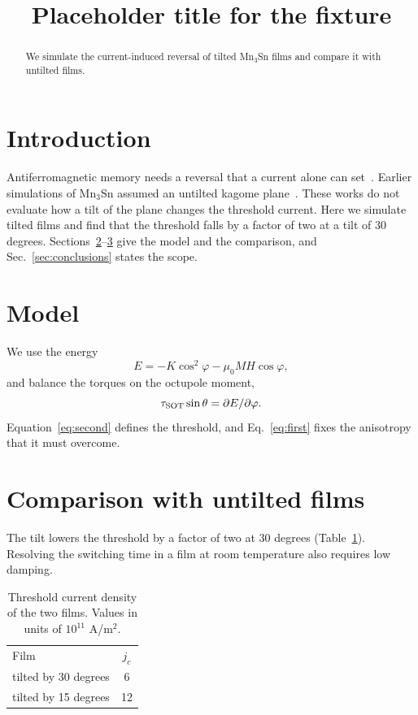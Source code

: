 \documentclass[aip,reprint]{revtex4-2}
\begin{document}
\title{Placeholder title for the fixture}
\begin{abstract}
We simulate the current-induced reversal of tilted Mn$_3$Sn films and compare it with untilted films.
\end{abstract}
\maketitle

\section{Introduction}
Antiferromagnetic memory needs a reversal that a current alone can set~\cite{A}.
Earlier simulations of Mn$_3$Sn assumed an untilted kagome plane~\cite{B}.
These works do not evaluate how a tilt of the plane changes the threshold current.
Here we simulate tilted films and find that the threshold falls by a factor of two at a tilt of 30 degrees.
Sections~\ref{sec:model}--\ref{sec:comparison} give the model and the comparison, and Sec.~\ref{sec:conclusions} states the scope.

\section{Model}
\label{sec:model}
We use the energy
\begin{equation}
E=-K\cos^2\varphi-\mu_0 M H\cos\varphi,
\label{eq:first}
\end{equation}
and balance the torques on the octupole moment,
\begin{equation}
\tau_{\rm SOT}\sin\theta=\partial E/\partial\varphi.
\label{eq:second}
\end{equation}
Equation~\eqref{eq:second} defines the threshold, and Eq.~\eqref{eq:first} fixes the anisotropy that it must overcome.

\section{Comparison with untilted films}
\label{sec:comparison}
The tilt lowers the threshold by a factor of two at 30 degrees (Table~\ref{tab:values}).
Resolving the switching time in a film at room temperature also requires low damping.

\begin{table}[tb]
\caption{Threshold current density of the two films. Values in units of $10^{11}$ A/m$^2$.}
\label{tab:values}
\begin{ruledtabular}
\begin{tabular}{lc}
Film & $j_c$\\
tilted by 30 degrees & 6\\
tilted by 15 degrees & 12
\end{tabular}
\end{ruledtabular}
\end{table}
\end{document}
